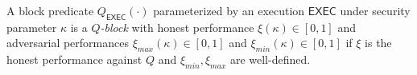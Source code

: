 \begin{definition}[$Q$-block]
	A block predicate $Q_{\textsf{EXEC}}(\cdot)$ parameterized by an execution
	$\textsf{EXEC}$ under security parameter $\kappa$ is a
	\emph{$Q$-block} with honest performance $\xi(\kappa) \in [0, 1]$ and adversarial
	performances $\xi_{max}(\kappa) \in [0, 1]$ and $\xi_{min}(\kappa) \in [0, 1]$
	if $\xi$ is the honest performance against $Q$ and $\xi_{min}, \xi_{max}$ are
	well-defined.
\end{definition}
